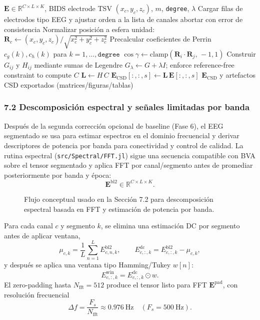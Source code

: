 \begin{algorithm}[H]
\caption{CSD mediante Laplaciano de splines esféricos de Perrin (como en \texttt{CSD.jl})}
\begin{algorithmic}
\Require $\mathbf{E}\in\mathbb{R}^{C\times L\times K}$, BIDS electrode TSV $(x_c,y_c,z_c)$, $m$, \texttt{degree}, $\lambda$
  \State Cargar filas de electrodos tipo EEG y ajustar orden a la lista de canales
  \State abortar con error de consistencia
\EndIf
{}
  \State Normalizar posición a esfera unidad: $\mathbf{R}_c\gets (x_c,y_c,z_c)/\sqrt{x_c^2+y_c^2+z_c^2}$
\EndFor
\State Precalcular coeficientes de Perrin $c_g(k), c_h(k)$ para $k=1,\dots,\texttt{degree}$
    \State $\cos\gamma \gets \mathrm{clamp}(\mathbf{R}_i\!\cdot\!\mathbf{R}_j,\,-1,1)$
    \State Construir $G_{ij}$ y $H_{ij}$ mediante sumas de Legendre
  \EndFor
\EndFor
\State $G_\lambda\gets G+\lambda I$; enforce reference-free constraint to compute $C$
\State $\mathbf{L}\gets H\,C$
  \State $\mathbf{E}_{\mathrm{CSD}}[:,:,s]\gets \mathbf{L}\,\mathbf{E}[:,:,s]$
\EndFor
\Ensure $\mathbf{E}_{\mathrm{CSD}}$ y artefactos CSD exportados (matrices/figuras/tablas)
\end{algorithmic}
\end{algorithm}

\subsubsection*{7.2 Descomposición espectral y señales limitadas por banda}
Después de la segunda corrección opcional de baseline (Fase 6), el EEG segmentado se usa para estimar espectros en el dominio frecuencial y derivar descriptores de potencia por banda para conectividad y control de calidad. La rutina espectral (\texttt{src/Spectral/FFT.jl}) sigue una secuencia compatible con BVA sobre el tensor segmentado y aplica FFT por canal/segmento antes de promediar posteriormente por banda y época:
\[
\mathbf{E}^{\mathrm{bl2}}\in\mathbb{R}^{C\times L\times K}.
\]

\begin{figure}[H]
\centering
\resizebox{0.88\textwidth}{!}{\NSFFTFlow}
\caption{Flujo conceptual usado en la Sección 7.2 para descomposición espectral basada en FFT y estimación de potencia por banda.}
\end{figure}

Para cada canal $c$ y segmento $k$, se elimina una estimación DC por segmento antes de aplicar ventana,
\[
\mu_{c,k}=\frac{1}{L}\sum_{n=1}^{L}E^{\mathrm{bl2}}_{c,n,k},
\qquad
E^{\mathrm{dc}}_{c,:,k}=E^{\mathrm{bl2}}_{c,:,k}-\mu_{c,k},
\]
y después se aplica una ventana tipo Hamming/Tukey $w[n]$:
\[
E^{\mathrm{win}}_{c,:,k}=E^{\mathrm{dc}}_{c,:,k}\odot w.
\]
El zero-padding hasta $N_{\mathrm{fft}}=512$ produce el tensor listo para FFT $\mathbf{E}^{\mathrm{pad}}$, con resolución frecuencial
\[
\Delta f=\frac{F_s}{N_{\mathrm{fft}}}\approx 0.976\ \mathrm{Hz}\quad (F_s=500\ \mathrm{Hz}).
\]

